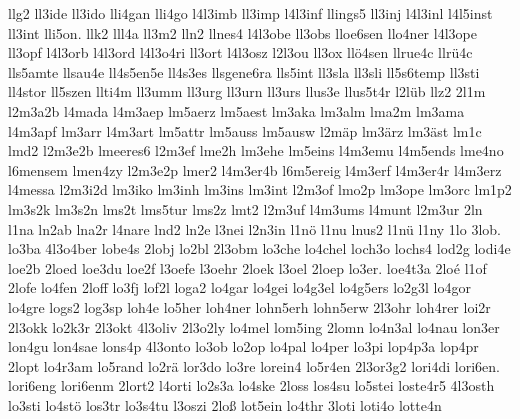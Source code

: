 {    llg2
    ll3ide
    ll3ido
    lli4gan
    lli4go
    l4l3imb
    ll3imp
    l4l3inf
    llings5
    ll3inj
    l4l3inl
    l4l5inst
    ll3int
    lli5on.
    llk2
    lll4a
    ll3m2
    lln2
    llnes4
    l4l3obe
    ll3obs
    lloe6sen
    llo4ner
    l4l3ope
    ll3opf
    l4l3orb
    l4l3ord
    l4l3o4ri
    ll3ort
    l4l3osz
    l2l3ou
    ll3ox
    llö4sen
    llrue4c
    llrü4c
    lls5amte
    llsau4e
    ll4s5en5e
    ll4s3es
    llsgene6ra
    lls5int
    ll3sla
    ll3sli
    ll5s6temp
    ll3sti
    ll4stor
    ll5szen
    llti4m
    ll3umm
    ll3urg
    ll3urn
    ll3urs
    llus3e
    llus5t4r
    l2lüb
    llz2
    2l1m
    l2m3a2b
    l4mada
    l4m3aep
    lm5aerz
    lm5aest
    lm3aka
    lm3alm
    lma2m
    lm3ama
    l4m3apf
    lm3arr
    l4m3art
    lm5attr
    lm5auss
    lm5ausw
    l2mäp
    lm3ärz
    lm3äst
    lm1c
    lmd2
    l2m3e2b
    lmeeres6
    l2m3ef
    lme2h
    lm3ehe
    lm5eins
    l4m3emu
    l4m5ends
    lme4no
    l6mensem
    lmen4zy
    l2m3e2p
    lmer2
    l4m3er4b
    l6m5ereig
    l4m3erf
    l4m3er4r
    l4m3erz
    l4messa
    l2m3i2d
    lm3iko
    lm3inh
    lm3ins
    lm3int
    l2m3of
    lmo2p
    lm3ope
    lm3orc
    lm1p2
    lm3s2k
    lm3s2n
    lms2t
    lms5tur
    lms2z
    lmt2
    l2m3uf
    l4m3ums
    l4munt
    l2m3ur
    2ln
    l1na
    ln2ab
    lna2r
    l4nare
    lnd2
    ln2e
    l3nei
    l2n3in
    l1nö
    l1nu
    lnus2
    l1nü
    l1ny
    1lo
    3lob.
    lo3ba
    4l3o4ber
    lobe4s
    2lobj
    lo2bl
    2l3obm
    lo3che
    lo4chel
    loch3o
    lochs4
    lod2g
    lodi4e
    loe2b
    2loed
    loe3du
    loe2f
    l3oefe
    l3oehr
    2loek
    l3oel
    2loep
    lo3er.
    loe4t3a
    2loé
    l1of
    2lofe
    lo4fen
    2loff
    lo3fj
    lof2l
    loga2
    lo4gar
    lo4gei
    lo4g3el
    lo4g5ers
    lo2g3l
    lo4gor
    lo4gre
    logs2
    log3sp
    loh4e
    lo5her
    loh4ner
    lohn5erh
    lohn5erw
    2l3ohr
    loh4rer
    loi2r
    2l3okk
    lo2k3r
    2l3okt
    4l3oliv
    2l3o2ly
    lo4mel
    lom5ing
    2lomn
    lo4n3al
    lo4nau
    lon3er
    lon4gu
    lon4sae
    lons4p
    4l3onto
    lo3ob
    lo2op
    lo4pal
    lo4per
    lo3pi
    lop4p3a
    lop4pr
    2lopt
    lo4r3am
    lo5rand
    lo2rä
    lor3do
    lo3re
    lorein4
    lo5r4en
    2l3or3g2
    lori4di
    lori6en.
    lori6eng
    lori6enm
    2lort2
    l4orti
    lo2s3a
    lo4ske
    2loss
    los4su
    lo5stei
    loste4r5
    4l3osth
    lo3sti
    lo4stö
    los3tr
    lo3s4tu
    l3oszi
    2loß
    lot5ein
    lo4thr
    3loti
    loti4o
    lotte4n
}
